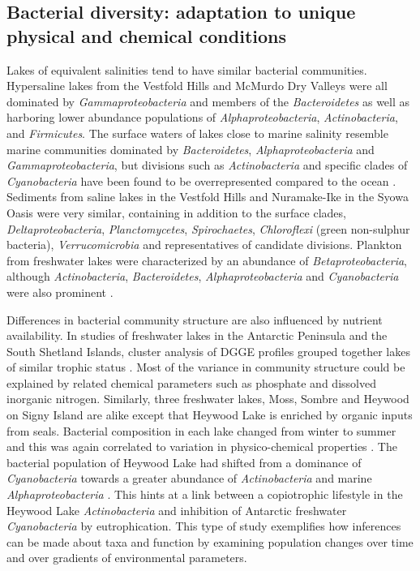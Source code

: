 \subsection{Bacterial diversity: adaptation to unique physical and chemical conditions}

Lakes of equivalent salinities tend to have similar bacterial communities.
Hypersaline lakes from the Vestfold Hills \cite{Bowman2000b} and McMurdo Dry Valleys \cite{Glatz2006, Mosier2007} were all dominated by \emph{Gammaproteobacteria} and members of the \emph{Bacteroidetes}
 as well as harboring lower abundance populations of \emph{Alphaproteobacteria}, \emph{Actinobacteria}, and \emph{Firmicutes}.
The surface waters of lakes close to marine salinity resemble marine communities dominated by \emph{Bacteroidetes}, \emph{Alphaproteobacteria} and \emph{Gammaproteobacteria},
 but divisions such as \emph{Actinobacteria} and specific clades of \emph{Cyanobacteria} have been found to be overrepresented compared to the ocean \cite{Lauro2011}.
Sediments from saline lakes in the Vestfold Hills \cite{Bowman2000a} and Nuramake-Ike in the Syowa Oasis \cite{Kurosawa2010} were very similar, 
containing in addition to the surface clades, \emph{Deltaproteobacteria}, \emph{Planctomycetes}, \emph{Spirochaetes}, \emph{Chloroflexi} (green non-sulphur bacteria), \emph{Verrucomicrobia} and representatives of candidate divisions.
Plankton from freshwater lakes were characterized by an abundance of \emph{Betaproteobacteria}, although \emph{Actinobacteria}, \emph{Bacteroidetes}, \emph{Alphaproteobacteria} and \emph{Cyanobacteria} were also prominent \cite{Pearce2003a, Pearce2005a, Pearce2005b, Schiaffino2009}. 


Differences in bacterial community structure are also influenced by nutrient availability.
In studies of freshwater lakes in the Antarctic Peninsula and the South Shetland Islands, cluster analysis of \ac{DGGE} profiles grouped together lakes of similar trophic status 
\cite{Schiaffino2009, Villaescusa2010}.
Most of the variance in community structure could be explained by related chemical parameters such as phosphate and dissolved inorganic nitrogen.
Similarly, three freshwater lakes, Moss, Sombre and Heywood on Signy Island are alike except that Heywood Lake is enriched by organic inputs from seals.
Bacterial composition in each lake changed from winter to summer and this was again correlated to variation in physico-chemical properties \cite{Pearce2005a}. 
The bacterial population of Heywood Lake had shifted from a dominance of \emph{Cyanobacteria} towards a greater abundance of \emph{Actinobacteria} and marine \emph{Alphaproteobacteria} \cite{Pearce2005b}.
This hints at a link between a copiotrophic lifestyle in the Heywood Lake \emph{Actinobacteria} and inhibition of Antarctic freshwater \emph{Cyanobacteria} by eutrophication. 
This type of study exemplifies how inferences can be made about taxa and function by examining population changes over time and over gradients of environmental parameters.


